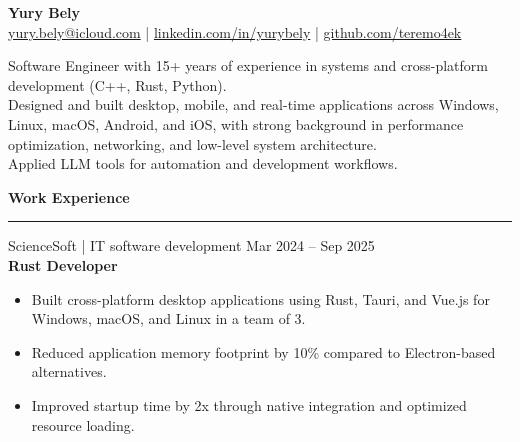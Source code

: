 \documentclass[10pt, a4paper]{article}
\newcommand{\heading}[1]{%
    \vspace{4pt}%
    \begin{center}{\color{accent}\large\bfseries #1}\end{center}%
    \vspace{-8pt}%
    \textcolor{accent}{\rule{\textwidth}{0.4pt}}%
    \vspace{4pt}%
}
\newcommand{\roleentry}[3]{%
    \vspace{8pt}%
    {\normalsize #1 \hfill {\small\color{graytext}#3}}\\[1pt]%
    {\textbf{#2}}%
    \vspace{1pt}%
}
\begin{document}
\begin{center}
    {\color{accent}\Large\bfseries Yury Bely}\\[8pt]
    {\small
    \href{mailto:yury.bely@icloud.com}{yury.bely@icloud.com}
    \enspace\color{graytext}|\color{black}\enspace
    \href{https://linkedin.com/in/yurybely}{linkedin.com/in/yurybely}
    \enspace\color{graytext}|\color{black}\enspace
    \href{https://github.com/teremo4ek}{github.com/teremo4ek}}
\end{center}

\vspace{4pt}

\noindent\color{graytext}\small
Software Engineer with 15+ years of experience in systems and cross-platform development (C++, Rust, Python).\\
Designed and built desktop, mobile, and real-time applications across Windows, Linux, macOS, Android, and iOS, with strong background in performance optimization, networking, and low-level system architecture.\\
Applied LLM tools for automation and development workflows.

\heading{Work Experience}

\roleentry{ScienceSoft | IT software development}{Rust Developer}{Mar 2024 -- Sep 2025}
\begin{itemize}
    \item Built cross-platform desktop applications using Rust, Tauri, and Vue.js for Windows, macOS, and Linux in a team of 3.
    \item Reduced application memory footprint by 10\% compared to Electron-based alternatives.
    \item Improved startup time by 2x through native integration and optimized resource loading.
\end{itemize}
\end{document}
